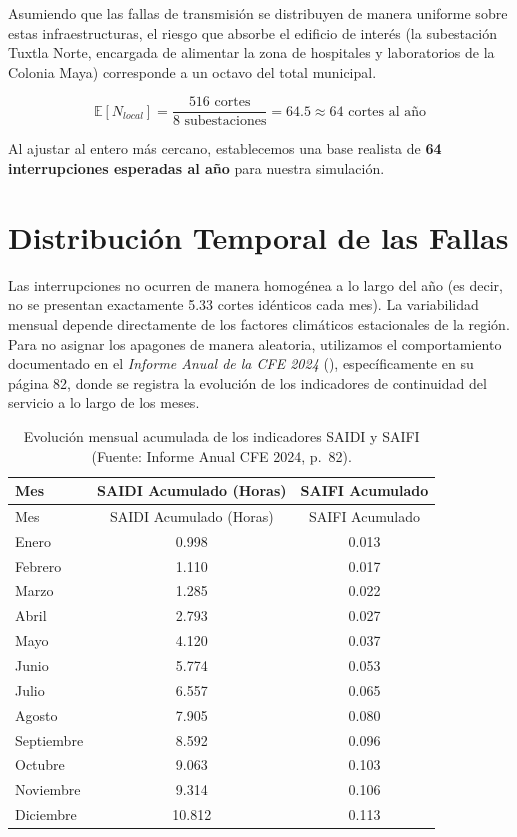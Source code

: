 \documentclass[
  spanish,
  letterpaper,
  DIV=11,
  numbers=noendperiod]{scrreprt}
\theoremstyle{plain}
\theoremstyle{definition}
\theoremstyle{remark}
\begin{document}
Asumiendo que las fallas de transmisión se distribuyen de manera
uniforme sobre estas infraestructuras, el riesgo que absorbe el edificio
de interés (la subestación Tuxtla Norte, encargada de alimentar la zona
de hospitales y laboratorios de la Colonia Maya) corresponde a un octavo
del total municipal.

\[\mathbb{E}[N_{local}] = \frac{516 \text{ cortes}}{8 \text{ subestaciones}} = 64.5 \approx 64 \text{ cortes al año}\]

Al ajustar al entero más cercano, establecemos una base realista de
\textbf{64 interrupciones esperadas al año} para nuestra simulación.

\section{Distribución Temporal de las
Fallas}\label{distribuciuxf3n-temporal-de-las-fallas}

Las interrupciones no ocurren de manera homogénea a lo largo del año (es
decir, no se presentan exactamente 5.33 cortes idénticos cada mes). La
variabilidad mensual depende directamente de los factores climáticos
estacionales de la región. Para no asignar los apagones de manera
aleatoria, utilizamos el comportamiento documentado en el \emph{Informe
Anual de la CFE 2024} (), específicamente en su página 82, donde se registra
la evolución de los indicadores de continuidad del servicio a lo largo
de los meses.

\begin{longtable}[]{@{}lcc@{}}
\caption{Evolución mensual acumulada de los indicadores SAIDI y SAIFI
(Fuente: Informe Anual CFE 2024,
p.~82).}\label{tbl-saidi-saifi}\tabularnewline
\toprule\noalign{}
Mes & SAIDI Acumulado (Horas) & SAIFI Acumulado \\
\midrule\noalign{}
\endfirsthead
\toprule\noalign{}
Mes & SAIDI Acumulado (Horas) & SAIFI Acumulado \\
\midrule\noalign{}
\endhead
\bottomrule\noalign{}
\endlastfoot
Enero & 0.998 & 0.013 \\
Febrero & 1.110 & 0.017 \\
Marzo & 1.285 & 0.022 \\
Abril & 2.793 & 0.027 \\
Mayo & 4.120 & 0.037 \\
Junio & 5.774 & 0.053 \\
Julio & 6.557 & 0.065 \\
Agosto & 7.905 & 0.080 \\
Septiembre & 8.592 & 0.096 \\
Octubre & 9.063 & 0.103 \\
Noviembre & 9.314 & 0.106 \\
Diciembre & 10.812 & 0.113 \\
\end{longtable}
\end{document}
